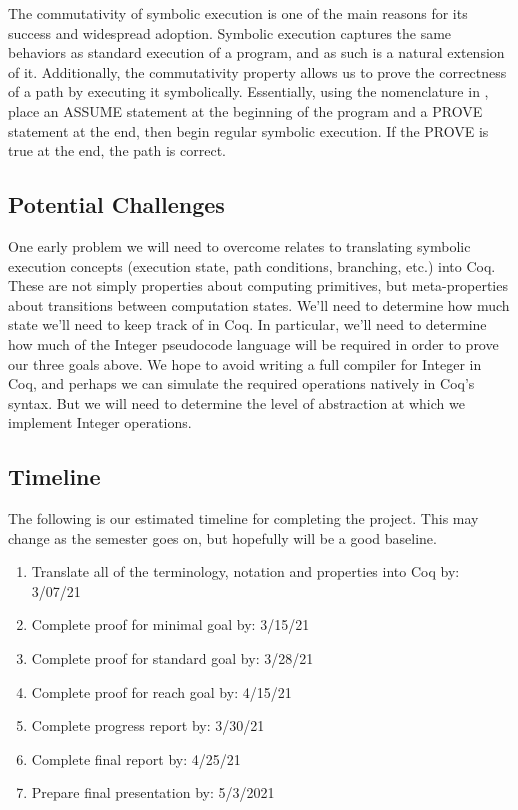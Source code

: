 \documentclass[11pt,conference]{IEEEtran}
\begin{document}
The commutativity of symbolic execution is one of the main reasons for its success and widespread adoption. Symbolic execution captures the same behaviors as standard execution of a program, and as such is a natural extension of it. Additionally, the commutativity property allows us to prove the correctness of a path by executing it symbolically. Essentially, using the nomenclature in \cite{b1}, place an ASSUME statement at the beginning of the program and a PROVE statement at the end, then begin regular symbolic execution. If the PROVE is true at the end, the path is correct.

\subsection{Potential Challenges}

One early problem we will need to overcome relates to translating symbolic execution concepts (execution state, path conditions, branching, etc.) into Coq. These are not simply properties about computing primitives, but meta-properties about transitions between computation states. We'll need to determine how much state we'll need to keep track of in Coq. In particular, we'll need to determine how much of the Integer pseudocode language will be required in order to prove our three goals above. We hope to avoid writing a full compiler for Integer in Coq, and perhaps we can simulate the required operations natively in Coq's syntax. But we will need to determine the level of abstraction at which we implement Integer operations.

\subsection{Timeline}

The following is our estimated timeline for completing the project. This may change as the semester goes on, but hopefully will be a good baseline. 

\begin{enumerate}
    \item Translate all of the terminology, notation and properties into Coq by:  3/07/21
    \item Complete proof for minimal goal by: 3/15/21
    \item Complete proof for standard goal by: 3/28/21
    \item Complete proof for reach goal by: 4/15/21
    \item Complete progress report by: 3/30/21
    \item Complete final report by: 4/25/21
    \item Prepare final presentation by: 5/3/2021
\end{enumerate}
\end{document}
